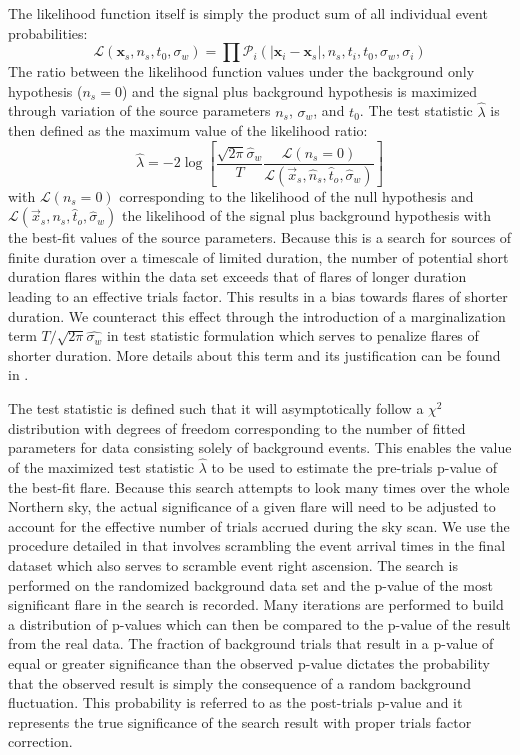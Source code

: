 \documentclass[manuscript]{aastex}
\begin{document}
The likelihood function itself is simply the product sum of all individual event probabilities:
\begin{equation}\label{eq:LLH}
\mathcal{L}(\mathbf{x}_s,n_s,t_0,\sigma_w) = \prod \mathcal{P}_i(|\mathbf{x}_i-\mathbf{x}_s|,n_s,t_i,t_0,\sigma_w,\sigma_i)
\end{equation}
The ratio between the likelihood function values under the background only hypothesis ($n_s=0$) and the signal plus background hypothesis is maximized through variation of the source parameters $n_s$, $\sigma_w$, and $t_0$. The test statistic $\hat{\lambda}$ is then defined as the maximum value of the likelihood ratio:
\begin{equation}\label{eq:TS}
\hat{\lambda} = -2\log \left[\frac{\sqrt{2\pi}\hat{\sigma}_w}{T}\frac{\mathcal{L}(n_s = 0)}{\mathcal{L}(\vec{x}_s,\hat{n}_s,\hat{t}_o,\hat{\sigma}_w)} \right]
\end{equation}
with $\mathcal{L}(n_s = 0)$ corresponding to the likelihood of the null hypothesis and $\mathcal{L}(\vec{x}_s,{n}_s,\hat{t}_o,\hat{\sigma}_w)$ the likelihood of the signal plus background hypothesis with the best-fit values of the source parameters. Because this is a search for sources of finite duration over a timescale of limited duration, the number of potential short duration flares within the data set exceeds that of flares of longer duration leading to an effective trials factor. This results in a bias towards flares of shorter duration. We counteract this effect through the introduction of a marginalization term $T/\sqrt{2\pi}\hat{\sigma_w}$ in test statistic formulation which serves to penalize flares of shorter duration. More details about this term and its justification can be found in \cite{2010APh....33..175B}.

The test statistic is defined such that it will asymptotically follow a $\chi^2$ distribution with degrees of freedom corresponding to the number of fitted parameters for data consisting solely of background events. This enables the value of the maximized test statistic $\hat{\lambda}$ to be used to estimate the pre-trials p-value of the best-fit flare. Because this search attempts to look many times over the whole Northern sky, the actual significance of a given flare will need to be adjusted to account for the effective number of trials accrued during the sky scan. We use the procedure detailed in \cite{2015arXiv150300598A} that involves scrambling the event arrival times in the final dataset which also serves to scramble event right ascension. The search is performed on the randomized background data set and the p-value of the most significant flare in the search is recorded. Many iterations are performed to build a distribution of p-values which can then be compared to the p-value of the result from the real data. The fraction of background trials that result in a p-value of equal or greater significance than the observed p-value dictates the probability that the observed result is simply the consequence of a random background fluctuation. This probability is referred to as the post-trials p-value and it represents the true significance of the search result with proper trials factor correction.
\end{document}
